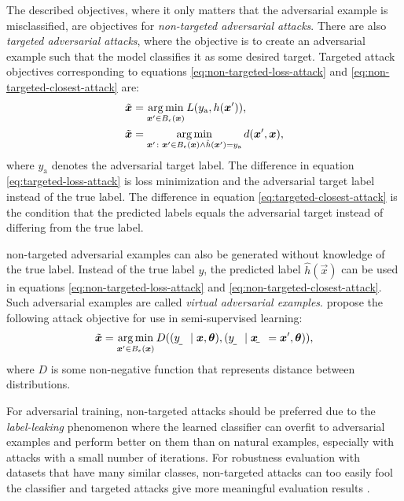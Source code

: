 \documentclass[oneside]{book}
\begin{document}
The described objectives, where it only matters that the adversarial example is misclassified, are objectives for \textit{non-targeted adversarial attacks}. There are also \textit{targeted adversarial attacks}, where the objective is to create an adversarial example such that the model classifies it as some desired target. Targeted attack objectives corresponding to equations \eqref{eq:non-targeted-loss-attack} and \eqref{eq:non-targeted-closest-attack} are:
\begin{align}
\tilde{\vec x} &= \argmin_{\vec x'\in B_\epsilon(\vec x)} L(y_\text{a}, h(\vec x')) \text{,} \label{eq:targeted-loss-attack} \\
\tilde{\vec x} &= \argmin_{\vec x'\colon \vec x'\in B_\epsilon(\vec x) \land \hat{h}(\vec x') = y_\text{a}} d(\vec x', \vec x) \text{,} \label{eq:targeted-closest-attack}
\end{align}
where $y_\text{a}$ denotes the adversarial target label. The difference in equation \eqref{eq:targeted-loss-attack} is loss minimization and the adversarial target label instead of the true label. The difference in equation \eqref{eq:targeted-closest-attack} is the condition that the predicted labels equals the adversarial target instead of differing from the true label.

non-targeted adversarial examples can also be generated without knowledge of the true label. Instead of the true label $y$, the predicted label $\hat{h}(\vec x)$ can be used in equations \eqref{eq:non-targeted-loss-attack} and \eqref{eq:non-targeted-closest-attack}. Such adversarial examples are called \textit{virtual adversarial examples}.
\citet{Miyato:2017:VATRMSSSL} propose the following attack objective for use in semi-supervised learning:
\begin{align}
\tilde{\vec x} = \argmin_{\vec x'\in B_\epsilon(\vec x)} D((\rvar y\mid \vec x, \vec\theta), (\rvar y\mid \rvec x = \vec x', \vec\theta)) \text{,}
\end{align}
where $D$ is some non-negative function that represents distance between distributions.

For adversarial training, non-targeted attacks should be preferred due to the \textit{label-leaking} phenomenon \citep{Kurakin:2016:AMLS} where the learned classifier can overfit to adversarial examples and perform better on them than on natural examples, especially with attacks with a small number of iterations. For robustness evaluation with datasets that have many similar classes, non-targeted attacks can too easily fool the classifier and targeted attacks give more meaningful evaluation results \citep{Athalye:2018:OGGFSS}.
\end{document}

